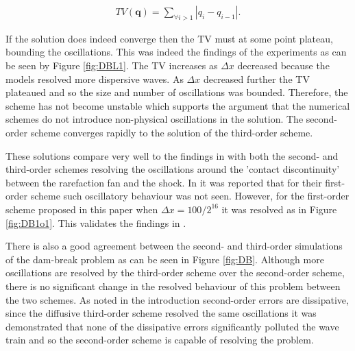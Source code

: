 \documentclass[SingleSpace,12pt]{Serre_ASCE}
\begin{document}
\begin{linenomath*}
\begin{gather}
TV(\boldsymbol{q}) = \sum_{\forall i >1} |q_{i} - q_{i-1}|.
\end{gather}
\end{linenomath*}
If the solution does indeed converge then the TV must at some point plateau, bounding the oscillations. This was indeed the findings of the experiments as can be seen by Figure \ref{fig:DBL1}. The TV increases as $\Delta x$ decreased because the models resolved more dispersive waves. As $\Delta x$ decreased further the TV plateaued and so the size and number of oscillations was bounded. Therefore, the scheme has not become unstable which supports the argument that the numerical schemes do not introduce non-physical oscillations in the solution. The second-order scheme converges rapidly to the solution of the third-order scheme.

These solutions compare very well to the findings in  with both the second- and third-order schemes resolving the oscillations around the 'contact discontinuity'\cite{El-etal-2006} between the rarefaction fan and the shock. In  it was reported that for their first-order scheme such oscillatory behaviour was not seen. However, for the first-order scheme proposed in this paper when $\Delta x = 100 /2^{16}$ it was resolved as in Figure \ref{fig:DB1o1}. This validates the findings in .

There is also a good agreement between the second- and third-order simulations of the dam-break problem as can be seen in Figure \ref{fig:DB}. Although more oscillations are resolved by the third-order scheme over the second-order scheme, there is no significant change in the resolved behaviour of this problem between the two schemes. As noted in the introduction second-order errors are dissipative, since the diffusive third-order scheme resolved the same oscillations it was demonstrated that none of the dissipative errors significantly polluted the wave train and so the second-order scheme is capable of resolving the problem.
\end{document}
